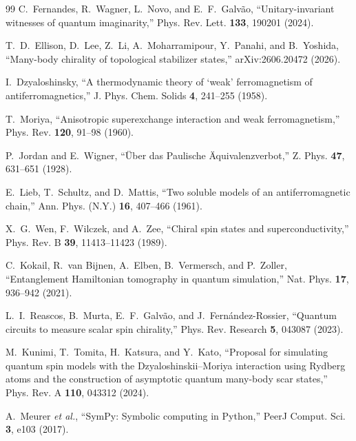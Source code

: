 \documentclass[aps,prb,preprint,nofootinbib,longbibliography]{revtex4-2}
\begin{document}
\begin{thebibliography}{99}
C.~Fernandes, R.~Wagner, L.~Novo, and E.~F.~Galv\~ao,
``Unitary-invariant witnesses of quantum imaginarity,''
Phys. Rev. Lett. \textbf{133}, 190201 (2024).

T.~D.~Ellison, D.~Lee, Z.~Li, A.~Moharramipour, Y.~Panahi, and B.~Yoshida,
``Many-body chirality of topological stabilizer states,''
arXiv:2606.20472 (2026).

I.~Dzyaloshinsky,
``A thermodynamic theory of `weak' ferromagnetism of antiferromagnetics,''
J. Phys. Chem. Solids \textbf{4}, 241--255 (1958).

T.~Moriya,
``Anisotropic superexchange interaction and weak ferromagnetism,''
Phys. Rev. \textbf{120}, 91--98 (1960).

P.~Jordan and E.~Wigner,
``\"Uber das Paulische \"Aquivalenzverbot,''
Z. Phys. \textbf{47}, 631--651 (1928).

E.~Lieb, T.~Schultz, and D.~Mattis,
``Two soluble models of an antiferromagnetic chain,''
Ann. Phys. (N.Y.) \textbf{16}, 407--466 (1961).

X.~G.~Wen, F.~Wilczek, and A.~Zee,
``Chiral spin states and superconductivity,''
Phys. Rev. B \textbf{39}, 11413--11423 (1989).

C.~Kokail, R.~van Bijnen, A.~Elben, B.~Vermersch, and P.~Zoller,
``Entanglement Hamiltonian tomography in quantum simulation,''
Nat. Phys. \textbf{17}, 936--942 (2021).

L.~I.~Reascos, B.~Murta, E.~F.~Galv\~ao, and J.~Fern\'andez-Rossier,
``Quantum circuits to measure scalar spin chirality,''
Phys. Rev. Research \textbf{5}, 043087 (2023).

M.~Kunimi, T.~Tomita, H.~Katsura, and Y.~Kato,
``Proposal for simulating quantum spin models with the
Dzyaloshinskii--Moriya interaction using Rydberg atoms and the construction of
asymptotic quantum many-body scar states,''
Phys. Rev. A \textbf{110}, 043312 (2024).

A.~Meurer \textit{et al.},
``SymPy: Symbolic computing in Python,''
PeerJ Comput. Sci. \textbf{3}, e103 (2017).

\end{thebibliography}
\end{document}
